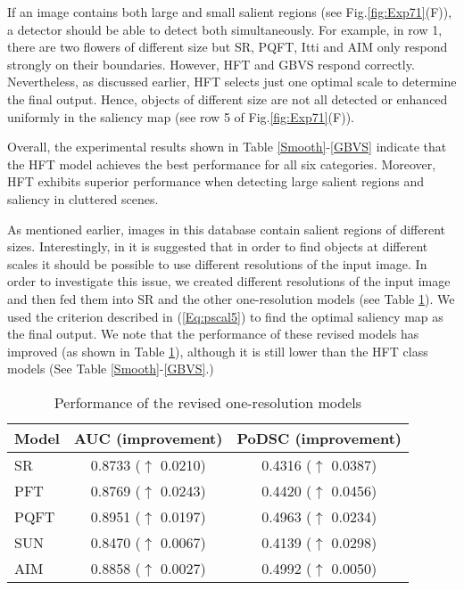 \documentclass[10pt,journal,cspaper,compsoc]{IEEEtran}
\begin{document}
If an image contains both large and small salient regions (see Fig.\ref{fig:Exp71}(F)), a detector should be able to detect both simultaneously. For example, in row 1, there are two flowers of different size but SR, PQFT, Itti and AIM only respond strongly on their boundaries. However, HFT and GBVS respond correctly. Nevertheless, as discussed earlier, HFT selects just one optimal scale to determine the final output. Hence, objects of different size are not all detected or enhanced uniformly in the saliency map (see row 5 of Fig.\ref{fig:Exp71}(F)).

Overall, the experimental results shown in Table \ref{Smooth}-\ref{GBVS} indicate that the HFT model achieves the best performance for all six categories. Moreover, HFT exhibits superior performance when detecting large salient regions and saliency in cluttered scenes.

As mentioned earlier, images in this database contain salient regions of different sizes. Interestingly, in \cite{hou2007saliency} it is suggested that in order to find objects at different scales it should be possible to use different resolutions of the input image. In order to investigate this issue, we created different resolutions of the input image and then fed them into SR and the other one-resolution models (see Table \ref{one-scale}). We used the criterion described in (\ref{Eq:pscal5}) to find the optimal saliency map as the final output. We note that the performance of these revised models has improved (as shown in Table \ref{one-scale}), although it is still lower than the HFT class models (See Table \ref{Smooth}-\ref{GBVS}.)

\begin{table}
\renewcommand{\arraystretch}{1.3}
\caption{Performance of the revised one-resolution models}
\label{one-scale}
\centering
\begin{tabular}{lcc}
\toprule
Model  & \bfseries AUC (improvement) & \bfseries PoDSC (improvement)\\
\hline
SR   & 0.8733 ($\uparrow$ 0.0210) & 0.4316 ($\uparrow$ 0.0387)\\
PFT  & 0.8769 ($\uparrow$ 0.0243) & 0.4420 ($\uparrow$ 0.0456)\\
PQFT & 0.8951 ($\uparrow$ 0.0197) & 0.4963 ($\uparrow$ 0.0234)\\
SUN  & 0.8470 ($\uparrow$ 0.0067) & 0.4139 ($\uparrow$ 0.0298)\\
AIM  & 0.8858 ($\uparrow$ 0.0027) & 0.4992 ($\uparrow$ 0.0050)\\
\bottomrule
\end{tabular}
\end{table}
\end{document}
